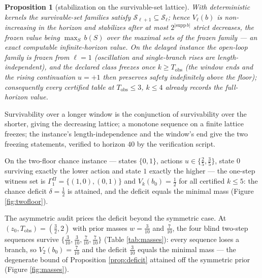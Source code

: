 \documentclass[10pt,twocolumn]{article}
\theoremstyle{plain}
\newtheorem{proposition}[theorem]{Proposition}
\theoremstyle{definition}
\theoremstyle{remark}
\begin{document}
\begin{proposition}[stabilization on the survivable-set lattice]\label{prop:freeze}
With deterministic kernels the survivable-set families satisfy
\(\mathcal{S}_{\ell+1} \subseteq \mathcal{S}_{\ell}\); hence
\(V_{\ell}(b)\) is non-increasing in the horizon and stabilizes after
at most \(2^{|\mathrm{supp}\, b|}\) strict decreases, the frozen value
being \(\max_{S}\, b(S)\) over the maximal sets of the frozen family
--- an exact computable infinite-horizon value. On the delayed instance
the open-loop family is frozen from \(\ell = 1\) (oscillation and
single-branch rises are length-independent), and the declared class
freezes once \(k \ge T_{\mathrm{obs}}\) (the window ends and the
rising continuation \(u = +1\) then preserves safety indefinitely
above the floor); consequently every certified table at
\(T_{\mathrm{obs}} \le 3\), \(k \le 4\) already records the
full-horizon value.
\end{proposition}

Survivability over a longer window is the conjunction of survivability
over the shorter, giving the decreasing lattice; a monotone sequence on a
finite lattice freezes; the instance's length-independence and the
window's end give the two freezing statements, verified to horizon
\(40\) by the verification script.

On the two-floor chance instance --- states \(\{0, 1\}\), actions
\(u \in \{\tfrac{2}{5}, \tfrac{3}{5}\}\), state \(0\) surviving exactly
the lower action and state \(1\) exactly the higher --- the one-step
witness set is \(\Gamma^{\Pi}_{1} = \{(1,0), (0,1)\}\) and
\(V_{k}(b_{0}) = \tfrac{1}{2}\) for all certified \(k \le 5\): the chance
deficit \(\delta = \tfrac{1}{2}\) is attained, and the deficit equals the
minimal mass (Figure \ref{fig:twofloor}).

The asymmetric audit prices the deficit beyond the symmetric case. At
\((z_{0}, T_{\mathrm{obs}}) = (\tfrac{3}{2}, 2)\) with prior masses
\(w = \tfrac{3}{10}\) and \(\tfrac{7}{10}\), the four blind two-step
sequences survive
\(\{ \tfrac{3}{10}, \tfrac{3}{10}, \tfrac{7}{10}, \tfrac{7}{10} \}\)
(Table \ref{tab:masses}): every sequence loses a branch, so
\(V_{2}(b_{0}) = \tfrac{7}{10}\) and the deficit \(\tfrac{3}{10}\) equals
the minimal mass --- the degenerate bound of Proposition
\ref{prop:deficit} attained off the symmetric prior (Figure
\ref{fig:masses}).
\end{document}
